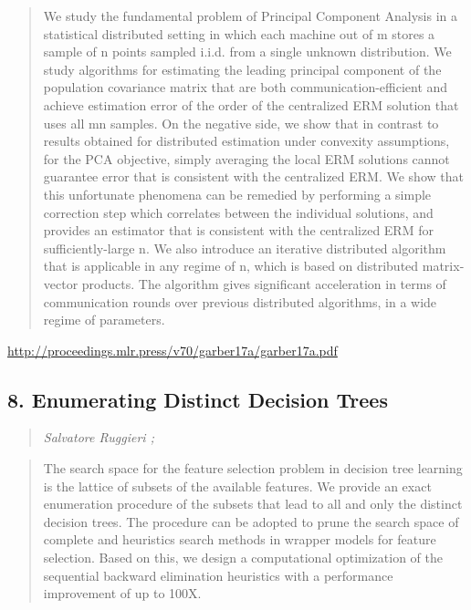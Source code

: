 \documentclass{article}
\begin{document}
\begin{quote}
    We study the fundamental problem of Principal Component Analysis in a statistical distributed setting in which each machine out of m stores a sample of n points sampled i.i.d. from a single unknown distribution. We study algorithms for estimating the leading principal component of the population covariance matrix that are both communication-efficient and achieve estimation error of the order of the centralized ERM solution that uses all mn samples. On the negative side, we show that in contrast to results obtained for distributed estimation under convexity assumptions, for the PCA objective, simply averaging the local ERM solutions cannot guarantee error that is consistent with the centralized ERM. We show that this unfortunate phenomena can be remedied by performing a simple correction step which correlates between the individual solutions, and provides an estimator that is consistent with the centralized ERM for sufficiently-large n. We also introduce an iterative distributed algorithm that is applicable in any regime of n, which is based on distributed matrix-vector products. The algorithm gives significant acceleration in terms of communication rounds over previous distributed algorithms, in a wide regime of parameters.  \end{quote}

\href{http://proceedings.mlr.press/v70/garber17a/garber17a.pdf}{http://proceedings.mlr.press/v70/garber17a/garber17a.pdf}

\subsection{8. Enumerating Distinct Decision Trees}

\begin{quote}
\footnotesize{\textit{Salvatore Ruggieri ;}}
\end{quote}

\begin{quote}
    The search space for the feature selection problem in decision tree learning is the lattice of subsets of the available features. We provide an exact enumeration procedure of the subsets that lead to all and only the distinct decision trees. The procedure can be adopted to prune the search space of complete and heuristics search methods in wrapper models for feature selection. Based on this, we design a computational optimization of the sequential backward elimination heuristics with a performance improvement of up to 100X.  \end{quote}
\end{document}
